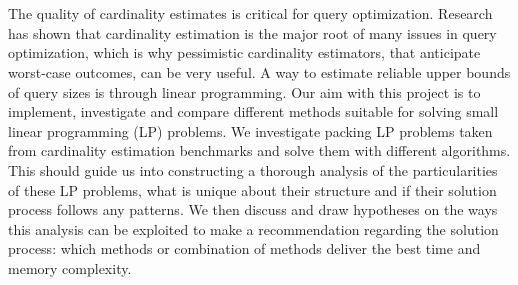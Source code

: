 \chapter{\abstractname}

The quality of cardinality estimates is critical for query optimization.
Research has 
shown that cardinality estimation is the major root of many issues in 
query optimization, which is why pessimistic cardinality estimators, that
anticipate worst-case outcomes, can be very useful.
A way to estimate reliable
upper bounds of query sizes is through linear programming.
Our aim with this project is to implement, 
investigate and compare different methods suitable for solving small linear programming (LP) problems.
We investigate packing LP problems taken from cardinality estimation benchmarks and solve them 
with different algorithms.
This should guide us into constructing a thorough analysis of the particularities of
these LP problems, what is unique about their structure and if their solution
process follows any patterns. We then discuss and draw hypotheses on the ways this 
analysis can be exploited to make a recommendation regarding the solution process: which methods or combination of methods deliver the best time and memory complexity.



